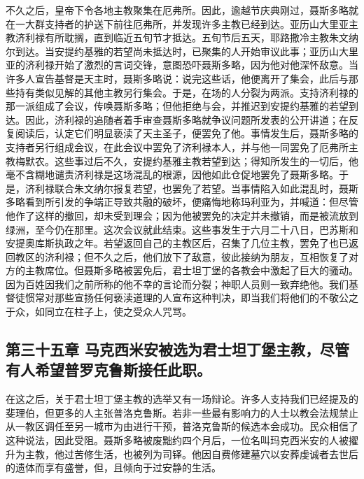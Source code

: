 不久之后，皇帝下令各地主教聚集在厄弗所。因此，逾越节庆典刚过，聂斯多略就在一大群支持者的护送下前往厄弗所，并发现许多主教已经到达。亚历山大里亚主教济利禄有所耽搁，直到临近五旬节才抵达。五旬节后五天，耶路撒冷主教朱文纳尔到达。当安提约基雅的若望尚未抵达时，已聚集的人开始审议此事；亚历山大里亚的济利禄开始了激烈的言词交锋，意图恐吓聂斯多略，因为他对他深怀敌意。当许多人宣告基督是天主时，聂斯多略说：说完这些话，他便离开了集会，此后与那些持有类似见解的其他主教另行集会。于是，在场的人分裂为两派。支持济利禄的那一派组成了会议，传唤聂斯多略；但他拒绝与会，并推迟到安提约基雅的若望到达。因此，济利禄的追随者着手审查聂斯多略就争议问题所发表的公开讲道；在反复阅读后，认定它们明显亵渎了天主圣子，便罢免了他。事情发生后，聂斯多略的支持者另行组成会议，在此会议中罢免了济利禄本人，并与他一同罢免了厄弗所主教梅默农。这些事过后不久，安提约基雅主教若望到达；得知所发生的一切后，他毫不含糊地谴责济利禄是这场混乱的根源，因他如此仓促地罢免了聂斯多略。于是，济利禄联合朱文纳尔报复若望，也罢免了若望。当事情陷入如此混乱时，聂斯多略看到所引发的争端正导致共融的破坏，便痛悔地称玛利亚为，并喊道：但尽管他作了这样的撤回，却未受到理会；因为他被罢免的决定并未撤销，而是被流放到绿洲，至今仍在那里。这次会议就此结束。这些事发生于六月二十八日，巴苏斯和安提奥库斯执政之年。若望返回自己的主教区后，召集了几位主教，罢免了也已返回教区的济利禄；但不久之后，他们放下了敌意，彼此接纳为朋友，互相恢复了对方的主教席位。但聂斯多略被罢免后，君士坦丁堡的各教会中激起了巨大的骚动。因为百姓因我们之前所称的他不幸的言论而分裂；神职人员则一致弃绝他。我们基督徒惯常对那些宣扬任何亵渎道理的人宣布这种判决，即当我们将他们的不敬公之于众，如同立在柱子上，使之受众人咒骂。\par


\subsection{第三十五章 马克西米安被选为君士坦丁堡主教，尽管有人希望普罗克鲁斯接任此职。}

在这之后，关于君士坦丁堡主教的选举又有一场辩论。许多人支持我们已经提及的斐理伯，但更多的人主张普洛克鲁斯。若非一些最有影响力的人士以教会法规禁止从一教区调任至另一城市为由进行干预，普洛克鲁斯的候选本会成功。民众相信了这种说法，因此受阻。聂斯多略被废黜约四个月后，一位名叫玛克西米安的人被擢升为主教，他过苦修生活，也被列为司铎。他因自费修建墓穴以安葬虔诚者去世后的遗体而享有盛誉，但，且倾向于过安静的生活。\newline{}\par

